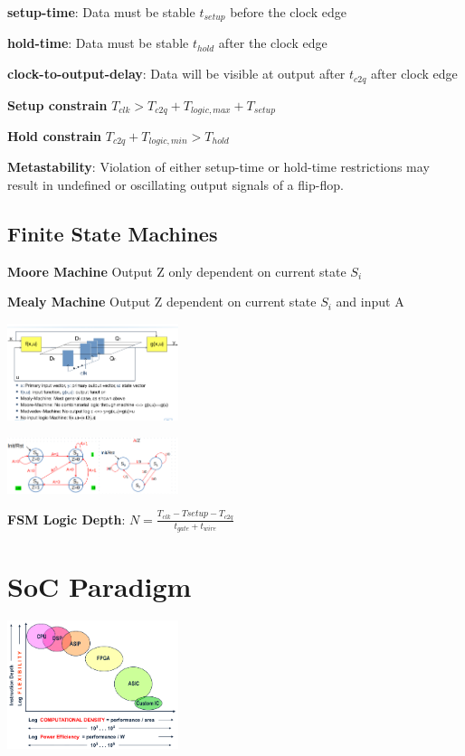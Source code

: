 \documentclass[english]{latex4ei/latex4ei_sheet}
\begin{document}
\textbf{setup-time}: Data must be stable $t_{setup}$ before the clock edge

\textbf{hold-time}: Data must be stable $t_{hold}$ after the clock edge

\textbf{clock-to-output-delay}: Data will be visible at output after $t_{c2q}$ after clock edge

\textbf{Setup constrain} $T_{clk} > T_{c2q} + T_{logic, max} + T_{setup}$

\textbf{Hold constrain} $T_{c2q} + T_{logic, min} > T_{hold}$

\textbf{Metastability}: Violation of either setup-time or hold-time restrictions may result in undefined or oscillating output signals of a flip-flop.


\subsection{Finite State Machines}

\textbf{Moore Machine} Output Z only dependent on current state $S_i$

\textbf{Mealy Machine} Output Z dependent on current state $S_i$ and input A

\begin{center}
	\includegraphics[width = 5cm]{images/2. SoC Logic Design Recap/FSM.png}
\end{center}
\begin{center}
	\includegraphics[width = 5cm]{images/2. SoC Logic Design Recap/MooreMealy.png}
\end{center}

\textbf{FSM Logic Depth}: $N = \frac{T_{clk} - T{setup} - T_{c2q}}{t_{gate} + t_{wire}}$



\section{SoC Paradigm}
\begin{center}
	\includegraphics[width = 5cm]{images/3.SoCParadigm/Paradigm.png}
\end{center}
\end{document}
